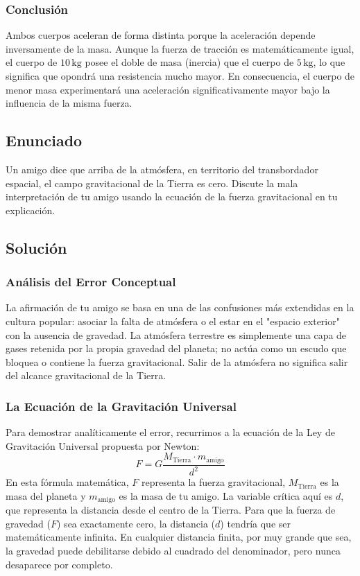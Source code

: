 \documentclass[12pt]{article}
\begin{document}
\subsubsection*{Conclusión}
Ambos cuerpos aceleran de forma distinta porque la aceleración depende inversamente de la masa. Aunque la fuerza de tracción es matemáticamente igual, el cuerpo de $10 \, \text{kg}$ posee el doble de masa (inercia) que el cuerpo de $5 \, \text{kg}$, lo que significa que opondrá una resistencia mucho mayor. En consecuencia, el cuerpo de menor masa experimentará una aceleración significativamente mayor bajo la influencia de la misma fuerza.

\newpage

\subsection*{Enunciado}
Un amigo dice que arriba de la atmósfera, en territorio del transbordador espacial, el campo gravitacional de la Tierra es cero. Discute la mala interpretación de tu amigo usando la ecuación de la fuerza gravitacional en tu explicación.

\subsection*{Solución}

\subsubsection*{Análisis del Error Conceptual}
La afirmación de tu amigo se basa en una de las confusiones más extendidas en la cultura popular: asociar la falta de atmósfera o el estar en el "espacio exterior" con la ausencia de gravedad. La atmósfera terrestre es simplemente una capa de gases retenida por la propia gravedad del planeta; no actúa como un escudo que bloquea o contiene la fuerza gravitacional. Salir de la atmósfera no significa salir del alcance gravitacional de la Tierra. 

\subsubsection*{La Ecuación de la Gravitación Universal}
Para demostrar analíticamente el error, recurrimos a la ecuación de la Ley de Gravitación Universal propuesta por Newton:
\begin{equation}
    F = G \frac{M_{\text{Tierra}} \cdot m_{\text{amigo}}}{d^2}
\end{equation}
En esta fórmula matemática, $F$ representa la fuerza gravitacional, $M_{\text{Tierra}}$ es la masa del planeta y $m_{\text{amigo}}$ es la masa de tu amigo. La variable crítica aquí es $d$, que representa la distancia desde el centro de la Tierra.
Para que la fuerza de gravedad ($F$) sea exactamente cero, la distancia ($d$) tendría que ser matemáticamente infinita. En cualquier distancia finita, por muy grande que sea, la gravedad puede debilitarse debido al cuadrado del denominador, pero nunca desaparece por completo.
\end{document}
